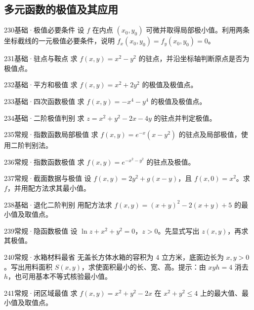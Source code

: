 \subsection{多元函数的极值及其应用}
\begin{exercise}{230}{基础·极值必要条件}
设 $f$ 在内点 $(x_0,y_0)$ 可微并取得局部极小值。利用两条坐标截线的一元极值必要条件，说明 $f_x(x_0,y_0)=f_y(x_0,y_0)=0$。
\end{exercise}
\begin{exercise}{231}{基础·驻点与鞍点}
求 $f(x,y)=x^2-y^2$ 的驻点，并沿坐标轴判断原点是否为极值点。
\end{exercise}
\begin{exercise}{232}{基础·平方和极值}
求 $f(x,y)=x^2+2y^2$ 的极值及极值点。
\end{exercise}
\begin{exercise}{233}{基础·四次函数极值}
求 $f(x,y)=-x^4-y^4$ 的极值及极值点。
\end{exercise}
\begin{exercise}{234}{基础·二阶极值判别}
求 $z=x^2+y^2-2x-4y$ 的驻点并判定极值。
\end{exercise}
\begin{exercise}{235}{常规·指数函数局部极值}
求 $f(x,y)=e^{-x}(x-y^2)$ 的驻点及局部极值，使用二阶判别法。
\end{exercise}
\begin{exercise}{236}{常规·指数函数极值}
求 $f(x,y)=e^{-x^2-y^2}$ 的驻点及极值。
\end{exercise}
\begin{exercise}{237}{常规·截面数据与极值}
设 $f(x,y)=2y^2+g(x-y)$，且 $f(x,0)=x^2$。求 $f$，并用配方法求其最小值。
\end{exercise}
\begin{exercise}{238}{基础·退化二阶判别}
用配方法求 $f(x,y)=(x+y)^2-2(x+y)+5$ 的最小值及取值点。
\end{exercise}
\begin{exercise}{239}{常规·隐函数极值}
设 $\ln z+x^2+y^2=0$，$z>0$。先显式写出 $z(x,y)$，再求其极值。
\end{exercise}
\begin{exercise}{240}{常规·水箱材料最省}
无盖长方体水箱的容积为 $4$ 立方米，底面边长为 $x,y>0$。写出用料面积 $S(x,y)$，求使面积最小的长、宽、高。提示：由 $xyh=4$ 消去 $h$，也可用基本不等式核验最小值。
\end{exercise}
\begin{exercise}{241}{常规·闭区域最值}
求 $f(x,y)=x^2+y^2-2x$ 在 $x^2+y^2\le4$ 上的最大值、最小值及取值点。
\end{exercise}
